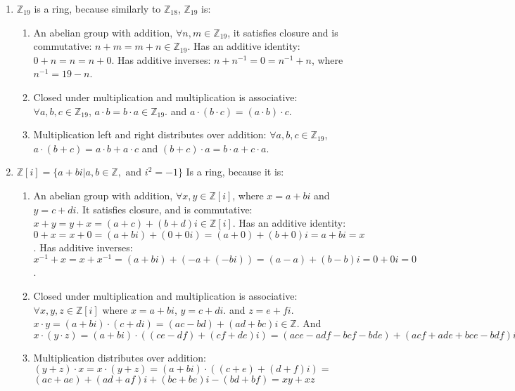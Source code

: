 \documentclass[12pt]{article}
\newcommand{\Z}{\mathbb{Z}}
\begin{document}
\begin{enumerate}
\begin{enumerate}
    \end{enumerate}
    \item $\Z_{19}$ is a ring, because similarly to $\Z_{18}$, $\Z_{19}$ is: \begin{enumerate}
        \item An abelian group with addition, $\forall n,m\in\Z_{19}$, it satisfies closure and is commutative: $n+m=m+n\in\Z_{19}$. \newline Has an additive identity: $0+n=n=n+0$. \newline Has additive inverses: $n+n^{-1}=0=n^{-1}+n$, where $n^{-1}=19-n$. 
        \item Closed under multiplication and multiplication is associative: $\forall a,b,c\in\Z_{19}$, $a\cdot b=b\cdot a\in\Z_{19}$. and $a\cdot(b\cdot c)=(a\cdot b)\cdot c$.
        \item Multiplication left and right distributes over addition: $\forall a,b,c\in\Z_{19}$, $a\cdot(b+c)=a\cdot b+a\cdot c$ and $(b+c)\cdot a=b\cdot a+c\cdot a$.
    \end{enumerate}
    \item $\Z[i]=\{a+bi|a,b\in\Z,\text{ and }i^2=-1\}$ Is a ring, because it is: \begin{enumerate}
        \item An abelian group with addition, $\forall x,y\in\Z[i]$, where $x=a+bi$ and $y=c+di$. \newline It satisfies closure, and is commutative: $x+y=y+x=(a+c)+(b+d)i\in\Z[i]$. \newline Has an additive identity: $0+x=x+0=(a+bi)+(0+0i)=(a+0)+(b+0)i=a+bi=x$. \newline Has additive inverses: $x^{-1}+x=x+x^{-1}=(a+bi)+(-a+(-bi))=(a-a)+(b-b)i=0+0i=0$.
        \item Closed under multiplication and multiplication is associative: \newline $\forall x,y,z\in\Z[i]$ where $x=a+bi$, $y=c+di$. \newline and $z=e+fi$. $x\cdot y=(a+bi)\cdot(c+di)=(ac-bd)+(ad+bc)i\in\Z$. And $x\cdot(y\cdot z)=(a+bi)\cdot((ce-df)+(cf+de)i)=(ace-adf-bcf-bde)+(acf+ade+bce-bdf)i=(e+fi)\cdot((ac-bd)+(ad+bc)i)=z\cdot(x\cdot y)$
        \item Multiplication distributes over addition: \newline $(y+z)\cdot x=x\cdot(y+z)=(a+bi)\cdot((c+e)+(d+f)i)=$\newline $(ac+ae)+(ad+af)i+(bc+be)i-(bd+bf)=xy+xz$
    \end{enumerate}
\end{enumerate}
\end{document}
